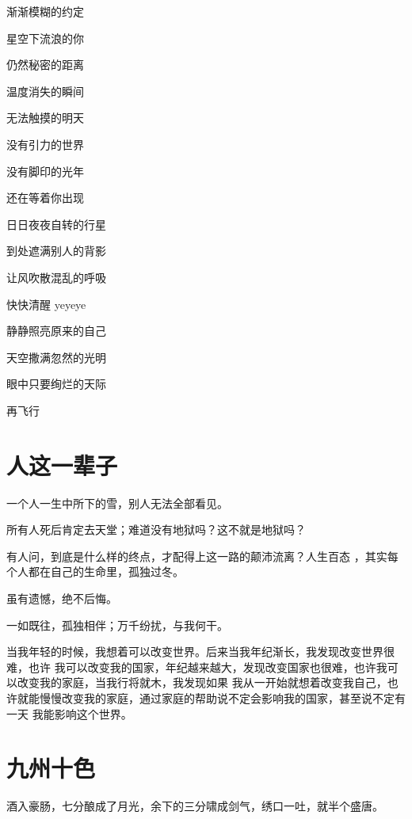 \documentclass[UTF8,oneside]{ctexbook}
\begin{document}
\quad \quad \quad \quad \quad 渐渐模糊的约定

\quad \quad \quad \quad \quad 星空下流浪的你

\quad \quad \quad \quad \quad 仍然秘密的距离

\quad \quad \quad \quad \quad 温度消失的瞬间

\quad \quad \quad \quad \quad 无法触摸的明天

\quad \quad \quad \quad \quad 没有引力的世界

\quad \quad \quad \quad \quad 没有脚印的光年

\quad \quad \quad \quad \quad 还在等着你出现

\quad \quad \quad \quad \quad 日日夜夜自转的行星

\quad \quad \quad \quad \quad 到处遮满别人的背影

\quad \quad \quad \quad \quad 让风吹散混乱的呼吸

\quad \quad \quad \quad \quad 快快清醒 yeyeye

\quad \quad \quad \quad \quad 静静照亮原来的自己

\quad \quad \quad \quad \quad 天空撒满忽然的光明

\quad \quad \quad \quad \quad 眼中只要绚烂的天际

\quad \quad \quad \quad \quad 再飞行

\section{人这一辈子}
\mfApache \quad 一个人一生中所下的雪，别人无法全部看见。

\mfApache \quad 所有人死后肯定去天堂；难道没有地狱吗？这不就是地狱吗？

\mfApache \quad 有人问，到底是什么样的终点，才配得上这一路的颠沛流离？人生百态
，其实每个人都在自己的生命里，孤独过冬。

\mfApache \quad 虽有遗憾，绝不后悔。

\mfApache \quad 一如既往，孤独相伴；万千纷扰，与我何干。

\mfApache \quad 当我年轻的时候，我想着可以改变世界。后来当我年纪渐长，我发现改变世界很难，也许
我可以改变我的国家，年纪越来越大，发现改变国家也很难，也许我可以改变我的家庭，当我行将就木，我发现如果
我从一开始就想着改变我自己，也许就能慢慢改变我的家庭，通过家庭的帮助说不定会影响我的国家，甚至说不定有一天
我能影响这个世界。

\mfApache \quad

\section{九州十色}
\mfApache \quad 酒入豪肠，七分酿成了月光，余下的三分啸成剑气，绣口一吐，就半个盛唐。
\end{document}
